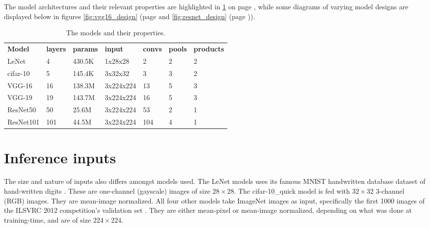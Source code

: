 
The model architectures and their relevant properties are highlighted in \ref{tbl:models} on page \pageref{tbl:models}, while some diagrams of varying model designs are displayed below in figures \ref{fig:vgg16_design} (page \pageref {fig:vgg16_design} and \ref{fig:resnet_design} (page \pageref{fig:resnet_design})).



\begin{table}[]
\centering
\caption[Model properties]{The models and their properties.}
\label{tbl:models}
\begin{tabular}{lllllll}
\textbf{Model}     & \textbf{layers} & \textbf{params} & \textbf{input} & \textbf{convs} & \textbf{pools} & \textbf{products} \\
LeNet     & 4               & 430.5K          & 1x28x28        & 2              & 2              & 2                 \\
cifar-10  & 5               & 145.4K          & 3x32x32        & 3              & 3              & 2                 \\
VGG-16    & 16              & 138.3M          & 3x224x224      & 13             & 5              & 3                 \\
VGG-19    & 19              & 143.7M          & 3x224x224      & 16             & 5              & 3                 \\
ResNet50  & 50              & 25.6M           & 3x224x224      & 53             & 2              & 1                 \\
ResNet101 & 101             & 44.5M           & 3x224x224      & 104            & 4              & 1                
\end{tabular}
\end{table}

\section{Inference inputs}
The size and nature of inputs also differs amongst models used. The LeNet models uses its famous MNIST handwritten database dataset of hand-written digits \cite{mnist}. These are one-channel (gayscale) images of size $28\times28$. The cifar-10\_quick model is fed with $32\times32$ 3-channel (RGB) images. They are mean-image normalized. All four other models take ImageNet images as input, specifically the first 1000 images of the ILSVRC 2012 competition's validation set \cite{imagenet}. They are either mean-pixel or mean-image normalized, depending on what was done at training-time, and are of size $224\times224$.


